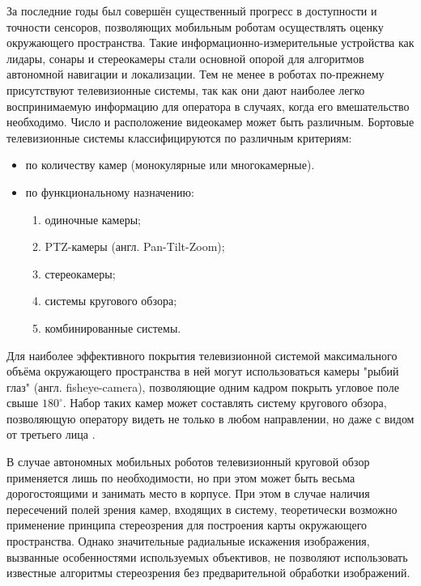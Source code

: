 За последние годы был совершён существенный прогресс в доступности и точности сенсоров, позволяющих мобильным роботам 
осуществлять оценку окружающего пространства. Такие информационно-измерительные устройства как лидары, сонары и стереокамеры
 стали основной опорой для алгоритмов автономной навигации и локализации. Тем не менее в роботах по-прежнему 
присутствуют телевизионные системы, так как они дают наиболее легко воспринимаемую информацию для оператора в случаях, когда 
его вмешательство необходимо. 
Число и расположение видеокамер может быть различным. Бортовые телевизионные системы классифицируются по различным 
критериям\cite{varlashin}:
\begin{itemize} 
    \item по количеству камер (монокулярные или многокамерные).
    \item по функциональному назначению:
    \begin{enumerate}[leftmargin=12mm]  %
        \item одиночные камеры;
        \item PTZ-камеры (англ. Pan-Tilt-Zoom);
        \item стереокамеры;
        \item системы кругового обзора;
        \item комбинированные системы.
    \end{enumerate}
\end{itemize}

Для наиболее эффективного покрытия телевизионной системой максимального объёма окружающего пространства в ней могут использоваться 
камеры "рыбий глаз" (англ. fisheye-camera), позволяющие одним кадром покрыть угловое поле свыше $180^\circ$.  
Набор таких камер может составлять систему кругового обзора, позволяющую оператору видеть не только в любом направлении,                
но даже с видом от третьего лица \cite{birdeye}. 
    
В случае автономных мобильных роботов телевизионный круговой обзор применяется лишь по необходимости, но при этом может быть весьма 
дорогостоящими и занимать место в корпусе. При этом в случае наличия пересечений полей зрения камер, входящих в систему, теоретически возможно 
применение принципа стереозрения для построения карты окружающего пространства. Однако значительные радиальные искажения изображения, вызванные 
особенностями используемых объективов, не позволяют использовать известные алгоритмы стереозрения без предварительной обработки изображений.                                   
 
